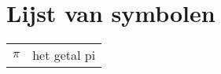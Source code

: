 
\chapter*{Lijst van symbolen}

\begin{center}
  \begin{tabularx}{0.8\textwidth}{p{1.5cm}X}
    $\pi$ & het getal pi\\
  \end{tabularx}
\end{center}
